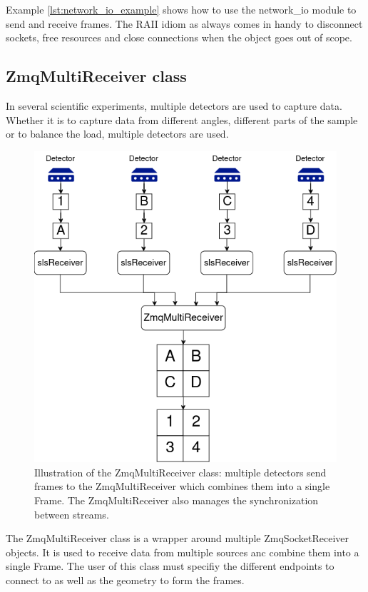 \documentclass[./chapitre3.tex]{subfiles}
\begin{document}
Example \ref{lst:network_io_example} shows how to use the network\_io module to send and receive frames.
The RAII idiom as always comes in handy to disconnect sockets, free resources and close connections when the
object goes out of scope.\\


\subsection{ZmqMultiReceiver class}
In several scientific experiments, multiple detectors are used to capture data. Whether
it is to capture data from different angles, different parts of the sample or to balance
the load, multiple detectors are used.\\

\begin{figure}
    \centering
    \includegraphics[width=\textwidth]{Chapitre3/figures/zmqmulti.png}
    \caption{Illustration of the ZmqMultiReceiver class: multiple detectors send frames to the ZmqMultiReceiver
        which combines them into a single Frame. The ZmqMultiReceiver also manages the synchronization between streams.}
    \label{fig:zmq_multi_receiver}
\end{figure}

The ZmqMultiReceiver class is a wrapper around multiple ZmqSocketReceiver objects. It is used
to receive data from multiple sources anc combine them into a single Frame. The user of this class
must specifiy the different endpoints to connect to as well as the geometry to form the frames.\\
\end{document}
